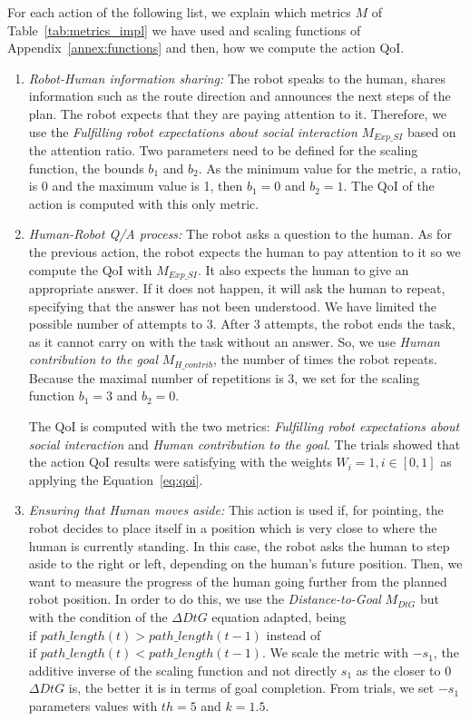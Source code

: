 \documentclass[a4paper,11pt,twoside]{StyleThese}
\begin{document}
For each action of the following list, we explain which metrics $M$ of Table~\ref{tab:metrics_impl} we have used and scaling functions of Appendix~\ref{annex:functions} and then, how we compute the action QoI. 
\begin{enumerate}[label=(\alph*)]
	\item \label{list_act:info} \emph{Robot-Human information sharing: }The robot speaks to the human, shares information such as the route direction and announces the next steps of the plan. The robot expects that they are paying attention to it. Therefore, we use the \emph{Fulfilling robot expectations about social interaction} $M_{Exp\_SI}$ based on the attention ratio. Two parameters need to be defined for the scaling function, the bounds $b_1$ and $b_2$. As the minimum value for the metric, a ratio, is 0 and the maximum value is 1, then $b_1=0$ and $b_2=1$. 
	The QoI of the action is computed with this only metric.
	
	\item \label{list_act:qa} \emph{Human-Robot Q/A process: } The robot asks a question to the human. As for the previous action, the robot expects the human to pay attention to it so we compute the QoI with $M_{Exp\_SI}$. It also expects the human to give an appropriate answer. If it does not happen, it will ask the human to repeat, specifying that the answer has not been understood. We have limited the possible number of attempts to 3. After 3 attempts, the robot ends the task, as it cannot carry on with the task without an answer. So, we use \emph{Human contribution to the goal} $M_{H\_contrib}$, the number of times the robot repeats. Because the maximal number of repetitions is 3, we set for the scaling function $b_1=3$ and $b_2=0$.
	
	The QoI is computed with the two metrics: \emph{Fulfilling robot expectations about social interaction} and \emph{Human contribution to the goal}.
	The trials showed that the action QoI results were satisfying with the weights $W_i=1, i \in [0,1]$ as applying the Equation~\eqref{eq:qoi}.
	
	\item \label{list_act:moves_aside} \emph{Ensuring that Human  moves aside: }This action is used if, for pointing, the robot decides to place itself in a position which is very close to where the human is currently standing. In this case, the robot asks the human to step aside to the right or left, depending on the human's future position. Then, we want to measure the progress of the human going further from the planned robot position. In order to do this, we use the \emph{Distance-to-Goal} $M_{DtG}$ but with the condition of the $\Delta DtG$ equation adapted, being $\text{if } path\_length(t) >  path\_length(t-1)$ instead of $\text{if } path\_length(t) <  path\_length(t-1)$. We scale the metric with  $-s_1$, the additive inverse of the scaling function and not directly $s_1$ as the closer to 0 $\Delta DtG$ is, the better it is in terms of goal completion. From trials, we set $-s_1$ parameters values with $th=5$ and $k=1.5$.
	

\end{enumerate}
\end{document}
